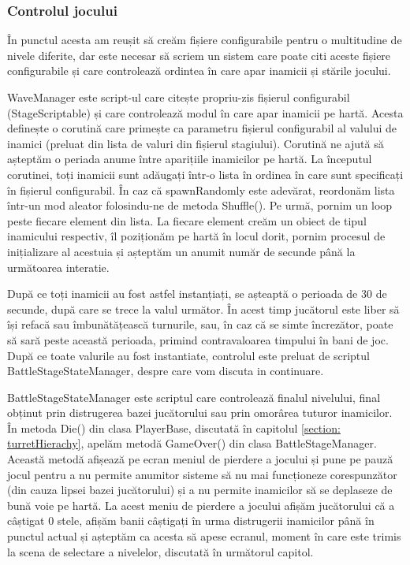 \documentclass[12pt, a4paper]{article}
\begin{document}
	
	
	
	
	\subsubsection{Controlul jocului}
	\label{section: gameState}
	
	În punctul acesta am reușit să creăm fișiere configurabile pentru o multitudine de nivele diferite, dar este necesar să scriem un sistem care poate citi aceste fișiere configurabile și care controlează ordintea în care apar inamicii și stările jocului.
	\newline
	
	WaveManager este script-ul care citește propriu-zis fișierul configurabil (StageScriptable) și care controlează modul în care apar inamicii pe hartă. Acesta definește o corutină care primește ca parametru fișierul configurabil al valului de inamici (preluat din lista de valuri din fișierul stagiului). Corutină ne ajută să așteptăm o periada anume între aparițiile inamicilor pe hartă. La începutul corutinei, toți inamicii sunt adăugați într-o lista în ordinea în care sunt specificați în fișierul configurabil. În caz că spawnRandomly este adevărat, reordonăm lista într-un mod aleator folosindu-ne de metoda Shuffle(). Pe urmă, pornim un loop peste fiecare element din lista. La fiecare element creăm un obiect de tipul inamicului respectiv, îl poziționăm pe hartă în locul dorit, pornim procesul de inițializare al acestuia și așteptăm un anumit număr de secunde până la următoarea interatie.
	\newline
	
	După ce toți inamicii au fost astfel instanțiați, se așteaptă o perioada de 30 de secunde, după care se trece la valul următor. În acest timp jucătorul este liber să își refacă sau îmbunătățească turnurile, sau, în caz că se simte încrezător, poate să sară peste această perioada, primind contravaloarea timpului în bani de joc. După ce toate valurile au fost instantiate, controlul este preluat de scriptul BattleStageStateManager, despre care vom discuta in continuare.
	\newline
	
	BattleStageStateManager este scriptul care controlează finalul nivelului, final obținut prin distrugerea bazei jucătorului sau prin omorârea tuturor inamicilor. În metoda Die() din clasa PlayerBase, discutată în capitolul \ref{section: turretHierachy}, apelăm metodă GameOver() din clasa BattleStageManager. Această metodă afișează pe ecran meniul de pierdere a jocului și pune pe pauză jocul pentru a nu permite anumitor sisteme să nu mai funcționeze corespunzător (din cauza lipsei bazei jucătorului) și a nu permite inamicilor să se deplaseze de bună voie pe hartă. La acest meniu de pierdere a jocului afișăm jucătorului că a câștigat 0 stele, afișăm banii câștigați în urma distrugerii inamicilor până în punctul actual și așteptăm ca acesta să apese ecranul, moment în care este trimis la scena de selectare a nivelelor, discutată în următorul capitol.
	\newline
	
\end{document}
